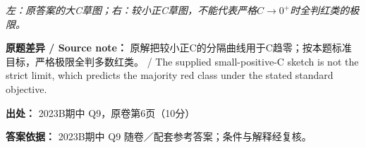 

\emph{左：原答案的大C草图；右：较小正C草图，不能代表严格\(C\to0^+\)时全判红类的极限。}


\textbf{原题差异 / Source note：} 原解把较小正C的分隔曲线用于C趋零；按本题标准目标，严格极限全判多数红类。 / The supplied small-positive-C sketch is not the strict limit, which predicts the majority red class under the stated standard objective.


\textbf{出处：} 2023B期中 Q9，原卷第6页（10分）


\textbf{答案依据：} 2023B期中 Q9 随卷／配套参考答案；条件与解释经复核。
